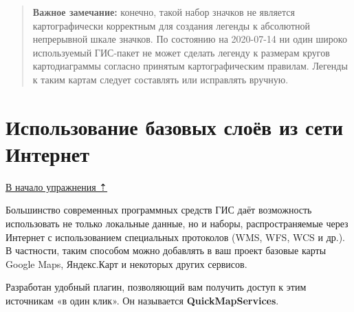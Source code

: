 \documentclass[
  12pt,
]{book}
\begin{document}
\begin{enumerate}
  \begin{quote}
  \textbf{Важное замечание:} конечно, такой набор значков не является картографически корректным для создания легенды к абсолютной непрерывной шкале значков. По состоянию на 2020-07-14 ни один широко используемый ГИС-пакет не может сделать легенду к размерам кругов картодиаграммы согласно принятым картографическим правилам. Легенды к таким картам следует составлять или исправлять вручную.
  \end{quote}
\end{enumerate}

\hypertarget{map-ref-districts-wms}{%
\section{Использование базовых слоёв из сети Интернет}\label{map-ref-districts-wms}}

\protect\hyperlink{map-ref-districts}{В начало упражнения ⇡}

Большинство современных программных средств ГИС даёт возможность использовать не только локальные данные, но и наборы, распространяемые через Интернет с использованием специальных протоколов (WMS, WFS, WCS и др.). В частности, таким способом можно добавлять в ваш проект базовые карты Google Maps, Яндекс.Карт и некоторых других сервисов.

Разработан удобный плагин, позволяющий вам получить доступ к этим источникам «в один клик». Он называется \textbf{QuickMapServices}.
\end{document}
